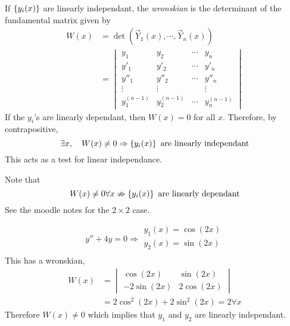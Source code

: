 \documentclass{article}
\begin{document}
\begin{defi}
    If $\left\{ y_i (x) \right\}$ are linearly independant,
    the \emph{wronskian} is the determinant of the fundamental matrix given by
    \begin{align*}
        W(x) &= \det (\vec Y_1 (x), \cdots, \vec Y_n (x)) \\
        &= \begin{vmatrix}
            y_1 & y_2 & \cdots & y_n \\
            y'_1 & y'_2 & \cdots & y'_n \\
            y''_1 & y''_2 & \cdots & y''_n \\
            \vdots & \vdots & & \vdots \\
            y^{(n-1)}_1 & y^{(n-1)}_2 & \cdots & y^{(n-1)}_n
        \end{vmatrix}
    \end{align*}
    If the $y_i$'s are linearly dependant, then $W(x) = 0$ for all $x$. 
    Therefore, by contrapositive,
    \[
       \exists x, \quad W(x) \neq 0 \Rightarrow \left\{ y_i(x) \right\} \text{ are linearly independant}
    \]
    This acts as a test for linear independance.
\end{defi}
\begin{remark}
    Note that
    \[
        W(x) \neq 0 \forall x \nRightarrow \left\{ y_i(x) \right\} \text{ are linearly dependant}
    \]
    See the moodle notes for the $2 \times 2$ case.
\end{remark}

\begin{eg}
    \[
        y'' + 4y = 0 \Rightarrow \begin{array}{c}
            y_1(x) = \cos (2x) \\
            y_2(x) = \sin (2x) \\
        \end{array}  
    \]
    This has a wronskian,
    \begin{align*}
        W(x) &= \begin{vmatrix}
            \cos (2x) & \sin (2x) \\ 
            - 2\sin(2x) & 2\cos(2x)
        \end{vmatrix} \\
        &= 2 \cos^2(2x) + 2 \sin^2(2x) = 2 \forall x
    \end{align*}
    Therefore $W(x) \neq 0$ which implies that $y_1$ and $y_2$ are linearly independant.
\end{eg}
\end{document}
